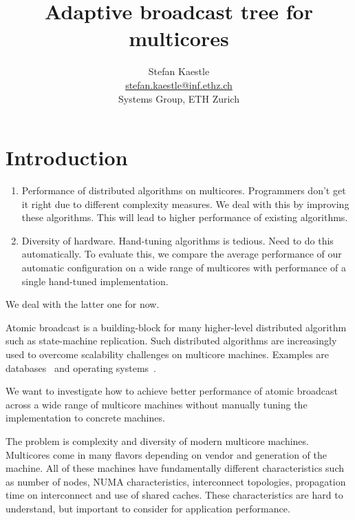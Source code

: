 \documentclass{article}
\begin{document}
\title{Adaptive broadcast tree for multicores}

\newcommand{\eaddr}{stefan.kaestle@inf.ethz.ch}
\newcommand{\email}{\href{mailto:\eaddr}{\eaddr}}

\author{Stefan Kaestle\\
  \email \\
  Systems Group, ETH Zurich}

\maketitle

\section{Introduction}

\begin{enumerate}
\item Performance of distributed algorithms on multicores. Programmers
  don't get it right due to different complexity measures. We deal
  with this by improving these algorithms. This will lead to higher
  performance of existing algorithms.
\item Diversity of hardware. Hand-tuning algorithms is tedious. Need
  to do this automatically. To evaluate this, we compare the average
  performance of our automatic configuration on a wide range of
  multicores with performance of a single hand-tuned implementation.
\end{enumerate}
We deal with the latter one for now.

% 
Atomic broadcast is a building-block for many higher-level distributed
algorithm such as state-machine replication. Such distributed
algorithms are increasingly used to overcome scalability challenges on
multicore machines. Examples are databases~\cite{Salomie2011,
  Wiesmann2000} and operating systems~\cite{fos:osr09, tornado:osdi99,
  barrelfish:sosp09}.

We want to investigate how to achieve better performance of atomic
broadcast across a wide range of multicore machines without manually
tuning the implementation to concrete machines.

The problem is complexity and diversity of modern multicore
machines. Multicores come in many flavors depending on vendor and
generation of the machine. All of these machines have fundamentally
different characteristics such as number of nodes, NUMA
characteristics, interconnect topologies, propagation time on
interconnect and use of shared caches. These characteristics are hard
to understand, but important to consider for application performance. 
\end{document}
